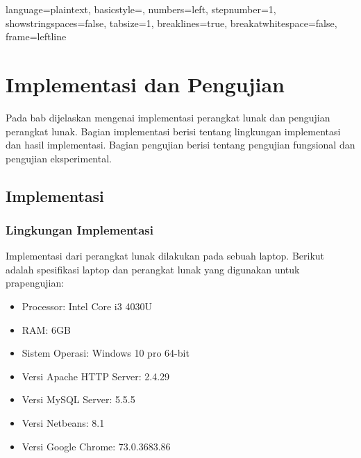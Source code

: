 

\lstset
{ 
    language=plaintext,
    basicstyle=\footnotesize,
    numbers=left,
    stepnumber=1,
    showstringspaces=false,
    tabsize=1,
    breaklines=true,
    breakatwhitespace=false,
    frame=leftline
}

\chapter{Implementasi dan Pengujian}
\label{chap:implementasidanpengujian}
Pada bab dijelaskan mengenai implementasi perangkat lunak dan pengujian perangkat lunak. Bagian implementasi berisi tentang lingkungan implementasi dan hasil implementasi. Bagian pengujian berisi tentang pengujian fungsional dan pengujian eksperimental. 

\section{Implementasi}
\label{sec:implementasi}
\subsection{Lingkungan Implementasi}
\label{subsec:lingkunganimplementasi5}
Implementasi dari perangkat lunak dilakukan pada sebuah laptop. Berikut adalah spesifikasi laptop dan perangkat lunak yang digunakan untuk prapengujian:
\begin{itemize}
\item Processor: Intel Core i3 4030U
\item RAM: 6GB
\item Sistem Operasi: Windows 10 pro 64-bit
\item Versi Apache HTTP Server: 2.4.29
\item Versi MySQL Server: 5.5.5
\item Versi Netbeans: 8.1
\item Versi Google Chrome: 73.0.3683.86
\end{itemize}

